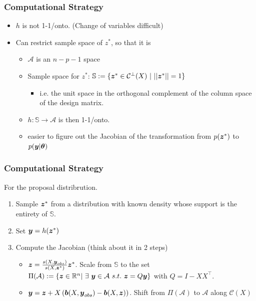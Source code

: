 \documentclass{beamer}
\def\bth{\mbox{\boldmath $\theta$}}
\newcommand{\by}{\mbox{\boldmath $y$}}
\newcommand{\bz}{\mbox{\boldmath $z$}}
\newcommand{\bb}{\mbox{\boldmath $b$}}
\begin{document}
\begin{frame}
	\frametitle{Computational Strategy}
	\begin{itemize}
	\item $h$ is not 1-1/onto. (Change of variables difficult)
	\item Can restrict sample space of $z^{*}$, so that it is
	\begin{itemize}
		\item $\mathcal{A}$ is an $n - p - 1$ space
		\item Sample space for $z^{*}$:  $\mathbb{S} := \{\bz^* \in \mathcal{C}^{\perp}(X)\  |\  ||\bz^*|| = 1\}$
		\begin{itemize}
			\item i.e. the unit space in the orthogonal complement of the column space of the design matrix.
		\end{itemize}
	\item $h: \mathbb{S} \rightarrow \mathcal{A}$ is then 1-1/onto.
	\item easier to figure out the Jacobian of the transformation from  $p(\bz^*)$ to $p(\by|\bth)$
	\end{itemize}
	
	\end{itemize}	
\end{frame}

\begin{frame}
	\frametitle{Computational Strategy}
	For the proposal distribrution. 
	\begin{enumerate}
		\item Sample $\bz^*$ from a distribution with known density whose support is the entirety of $\mathbb{S}$.
		\item Set $\by = h(\bz^*)$
		\item Compute the Jacobian (think about it in 2 steps)
	\begin{itemize}
		\item $\bz=\frac{s(X,\boldsymbol{y}_{obs})}{s(X, \boldsymbol{z}^{*})}\bz^{*}$. Scale from $\mathbb{S}$ to the set $\Pi(\mathcal{A}):= \{\bz\in \mathbb{R}^n |\ \exists\ \by\in \mathcal{A}\ s.t.\ \bz=Q \by \}$ with $Q = I - XX^{\top}$.
		\item $\by=\bz+X\left(\bb(X, \by_{obs})-\bb(X, \bz)\right)$. Shift from $\Pi(\mathcal{A})$ to $\mathcal{A}$ along $\mathcal{C}(X)$
	\end{itemize}
	\end{enumerate}
\end{frame}
\end{document}
